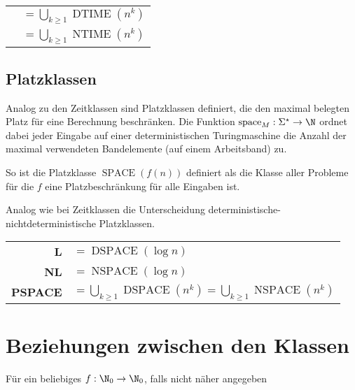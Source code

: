 \begin{center}
	\renewcommand{\arraystretch}{2}
	\begin{tabular}{rl}
		\poly&$=\displaystyle\bigcup_{k\geq 1} \operatorname{DTIME}(n^k)$\\
		\npoly&$=\displaystyle\bigcup_{k\geq 1} \operatorname{NTIME}(n^k)$
	\end{tabular}
\end{center}

\subsection{Platzklassen}
Analog zu den Zeitklassen sind Platzklassen definiert, die den maximal belegten Platz für eine Berechnung beschränken. Die Funktion $\mathrm{space}_M:\Sigma^\star\rightarrow \N$ ordnet dabei jeder Eingabe auf einer deterministischen Turingmaschine die Anzahl der maximal verwendeten Bandelemente (auf einem Arbeitsband) zu.

So ist die Platzklasse $\operatorname{SPACE}(f(n))$ definiert als die Klasse aller Probleme für die $f$ eine Platzbeschränkung für alle Eingaben ist.

Analog wie bei Zeitklassen die Unterscheidung deterministische-nichtdeterministische Platzklassen.
\begin{center}
	\renewcommand{\arraystretch}{2}
	\begin{tabular}{rl}
		\textbf{L}&$=\operatorname{DSPACE}(\log n)$\\
		\textbf{NL}&$=\operatorname{NSPACE}(\log n)$\\
		\textbf{PSPACE}&$=\displaystyle\bigcup_{k\geq 1} \operatorname{DSPACE}(n^k)=\bigcup_{k\geq 1} \operatorname{NSPACE}(n^k)$
	\end{tabular}
\end{center}

\section{Beziehungen zwischen den Klassen}
Für ein beliebiges $f:\N_0\rightarrow\N_0$, falls nicht näher angegeben
